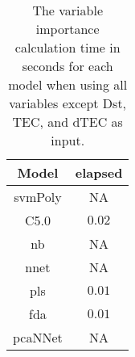 \begin{table}[!ht]
	\centering
	\begin{tabular}{|c|c|}
		\hline
		Model & elapsed \\ \hline
		svmPoly & NA \\ \hline
		C5.0 & $0.02$ \\ \hline
		nb & NA \\ \hline
		nnet & NA \\ \hline
		pls & $0.01$ \\ \hline
		fda & $0.01$ \\ \hline
		pcaNNet & NA \\ \hline
	\end{tabular}
	\caption{The variable importance calculation time in seconds for each model when using all variables except Dst, TEC, and dTEC as input.}
	\label{tab:time:noTEC:importance}
\end{table}
